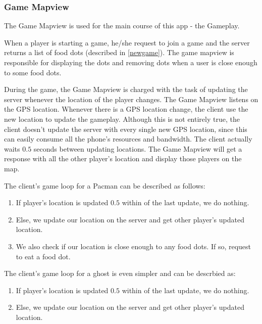 \documentclass{acm_proc_article-sp}
\begin{document}

\subsubsection{Game Mapview}
The Game Mapview is used for the main course of this app - the
Gameplay. 

When a player is starting a game, he/she request to join a game and
the server returns a list of food dots (described in
\ref{newgame}). The game mapview is responsible for displaying the
dots and removing dots when a user is close enough to some food dots.

During the game, the Game Mapview is charged with the task of updating
the server whenever the location of the player changes. The Game
Mapview listens on the GPS location. Whenever there is a GPS location
change, the client use the new location to update the
gameplay. Although this is not entirely true, the client doesn't
update the server with every single new GPS location, since this can
easily consume all the phone's resources and bandwidth. The client
actually waits $0.5$ seconds between updating locations. The Game
Mapview will get a response with all the other player's location and
display those players on the map.

The client's game loop for a Pacman can be described as follows:

\begin{enumerate}
\item If player's location is updated $0.5$ within of the last update, we do nothing.
\item Else, we update our location on the server and get other player's updated location.
\item We also check if our location is close enough to any food dots. If so, request to eat a food dot.
\end{enumerate}

The client's game loop for a ghost is even simpler and can be descrbied as:

\begin{enumerate}
\item If player's location is updated $0.5$ within of the last update, we do nothing.
\item Else, we update our location on the server and get other player's updated location.
\end{enumerate}
\end{document}
